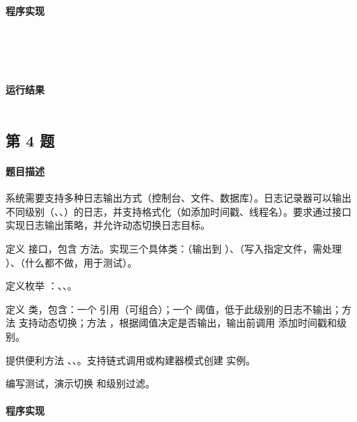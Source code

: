 \documentclass{academics}
\begin{document}
\paragraph{程序实现} {
    \inputminted[label=Staff.java]{java}{../src/P03/Staff.java}
    \inputminted[label=Employee.java]{java}{../src/P03/Employee.java}
    \inputminted[label=Manager.java]{java}{../src/P03/Manager.java}
    \inputminted[label=StockOption.java]{java}{../src/P03/StockOption.java}
    \inputminted[label=Company.java]{java}{../src/P03/Company.java}
}

\paragraph{运行结果} {
    \inputminted{text}{../res/P03.out}
}

\subsection{第 4 题}

\paragraph{题目描述} {
    系统需要支持多种日志输出方式（控制台、文件、数据库）。日志记录器可以输出不同级别（、、）的日志，并支持格式化（如添加时间戳、线程名）。要求通过接口实现日志输出策略，并允许动态切换日志目标。

    定义  接口，包含  方法。实现三个具体类：（输出到 ）、（写入指定文件，需处理 ）、（什么都不做，用于测试）。

    定义枚举 ：、、。

    定义  类，包含：一个  引用（可组合）；一个  阈值，低于此级别的日志不输出；方法  支持动态切换；方法 ，根据阈值决定是否输出，输出前调用  添加时间戳和级别。

    提供便利方法 、、。支持链式调用或构建器模式创建  实例。

    编写测试，演示切换  和级别过滤。
}

\paragraph{程序实现} {
    \inputminted[label=LogAppender.java]{java}{../src/P04/LogAppender.java}
    \inputminted[label=ConsoleAppender.java]{java}{../src/P04/ConsoleAppender.java}
    \inputminted[label=FileAppender.java]{java}{../src/P04/FileAppender.java}
    \inputminted[label=NullAppender.java]{java}{../src/P04/NullAppender.java}
    \inputminted[label=LogLevel.java]{java}{../src/P04/LogLevel.java}
    \inputminted[label=Logger.java]{java}{../src/P04/Logger.java}
    \inputminted[label=LogTest.java]{java}{../src/P04/LogTest.java}
}
\end{document}
